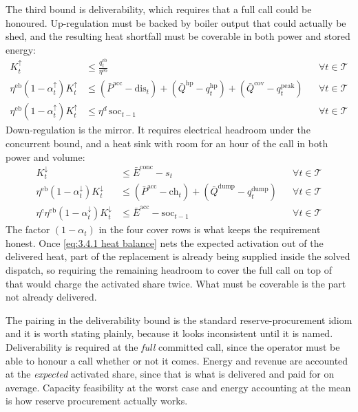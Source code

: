 The third bound is deliverability, which requires that a full call could be honoured. Up-regulation must be backed by boiler output that could actually be shed, and the resulting heat shortfall must be coverable in both power and stored energy:
\begin{align}
    K^{\uparrow}_t &\leq \frac{q^{\text{eb}}_t}{\eta^{\text{eb}}} && \forall t \in \mathcal{T} \label{eq:3.4.1 backed} \\
    \eta^{\text{eb}} (1 - \alpha^{\uparrow}_t) K^{\uparrow}_t &\leq (\bar{P}^{\text{acc}} - \text{dis}_t) + (\bar{Q}^{\text{hp}} - q^{\text{hp}}_t) + (\bar{Q}^{\text{cov}} - q^{\text{peak}}_t) && \forall t \in \mathcal{T} \label{eq:3.4.1 up power cover} \\
    \eta^{\text{eb}} (1 - \alpha^{\uparrow}_t) K^{\uparrow}_t &\leq \eta^{d}\, \text{soc}_{t-1} && \forall t \in \mathcal{T} \label{eq:3.4.1 up energy cover}
\end{align}
Down-regulation is the mirror. It requires electrical headroom under the concurrent bound, and a heat sink with room for an hour of the call in both power and volume:
\begin{align}
    K^{\downarrow}_t &\leq \bar{E}^{\text{conc}} - s_t && \forall t \in \mathcal{T} \label{eq:3.4.1 dn headroom} \\
    \eta^{\text{eb}} (1 - \alpha^{\downarrow}_t) K^{\downarrow}_t &\leq (\bar{P}^{\text{acc}} - \text{ch}_t) + (\bar{Q}^{\text{dump}} - q^{\text{dump}}_t) && \forall t \in \mathcal{T} \label{eq:3.4.1 dn sink power} \\
    \eta^{c} \eta^{\text{eb}} (1 - \alpha^{\downarrow}_t) K^{\downarrow}_t &\leq \bar{E}^{\text{acc}} - \text{soc}_{t-1} && \forall t \in \mathcal{T} \label{eq:3.4.1 dn sink energy}
\end{align}
The factor $(1 - \alpha_t)$ in the four cover rows is what keeps the requirement honest. Once \autoref{eq:3.4.1 heat balance} nets the expected activation out of the delivered heat, part of the replacement is already being supplied inside the solved dispatch, so requiring the remaining headroom to cover the full call on top of that would charge the activated share twice. What must be coverable is the part not already delivered.

The pairing in the deliverability bound is the standard reserve-procurement idiom and it is worth stating plainly, because it looks inconsistent until it is named. Deliverability is required at the \emph{full} committed call, since the operator must be able to honour a call whether or not it comes. Energy and revenue are accounted at the \emph{expected} activated share, since that is what is delivered and paid for on average. Capacity feasibility at the worst case and energy accounting at the mean is how reserve procurement actually works.

